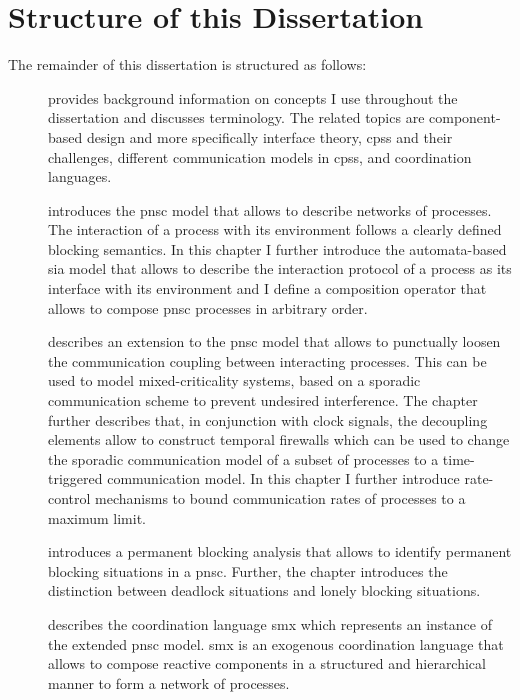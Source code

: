 \section{Structure of this Dissertation}
\label{sect_intro_structure}
The remainder of this dissertation is structured as follows:
\begin{description}
    \item[\Chap{\ref{chap_background}}] provides background information on concepts I use throughout the dissertation and discusses terminology.
        The related topics are component-based design and more specifically interface theory, \glspl{cps} and their challenges, different communication models in \glspl{cps}, and coordination languages.
    \item[\Chap{\ref{chap_ecm}}] introduces the \gls{pnsc} model that allows to describe networks of processes.
        The interaction of a process with its environment follows a clearly defined blocking semantics.
        In this chapter I further introduce the automata-based \gls{sia} model that allows to describe the interaction protocol of a process as its interface with its environment and I define a composition operator that allows to compose \gls{pnsc} processes in arbitrary order.
    \item[\Chap{\ref{chap_tcm}}] describes an extension to the \gls{pnsc} model that allows to punctually loosen the communication coupling between interacting processes.
        This can be used to model mixed-criticality systems, based on a sporadic communication scheme to prevent undesired interference.
        The chapter further describes that, in conjunction with clock signals, the decoupling elements allow to construct temporal firewalls which can be used to change the sporadic communication model of a subset of processes to a time-triggered communication model.
        In this chapter I further introduce rate-control mechanisms to bound communication rates of processes to a maximum limit.
    \item[\Chap{\ref{chap_block}}] introduces a permanent blocking analysis that allows to identify permanent blocking situations in a \gls{pnsc}.
        Further, the chapter introduces the distinction between deadlock situations and lonely blocking situations.
    \item[\Chap{\ref{chap_smx}}] describes the coordination language \gls*{smx} which represents an instance of the extended \gls{pnsc} model.
        \Gls*{smx} is an exogenous coordination language that allows to compose reactive components in a structured and hierarchical manner to form a network of processes.

\end{description}

